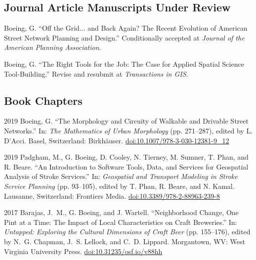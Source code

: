 \documentclass[12pt,letterpaper]{report}
\begin{document}
    \subsection*{Journal Article Manuscripts Under Review}

    \begin{tablist}
        
        \item[\the\year] \tab Boeing, G. \enquote{Off the Grid... and Back Again? The Recent Evolution of American Street Network Planning and Design.} Conditionally accepted at \textit{Journal of the American Planning Association}.        

        \item[\the\year] \tab Boeing, G. \enquote{The Right Tools for the Job: The Case for Applied Spatial Science Tool-Building.} Revise and resubmit at \textit{Transactions in GIS}.

    \end{tablist}



    \subsection*{Book Chapters}

    \begin{tablist}

        \item[2019] \tab Boeing, G. \enquote{The Morphology and Circuity of Walkable and Drivable Street Networks.} In: \textit{The Mathematics of Urban Morphology} (pp. 271--287), edited by L. D'Acci. Basel, Switzerland: Birkhäuser. \href{https://doi.org/10.1007/978-3-030-12381-9_12}{doi:10.1007/978-3-030-12381-9\_12}
        
        \item[2019] \tab Padgham, M., G. Boeing, D. Cooley, N. Tierney, M. Sumner, T. Phan, and R. Beare. \enquote{An Introduction to Software Tools, Data, and Services for Geospatial Analysis of Stroke Services.} In: \textit{Geospatial and Transport Modeling in Stroke Service Planning} (pp. 93--105), edited by T. Phan, R. Beare, and N. Kamal.  Lausanne, Switzerland: Frontiers Media. \href{https://doi.org/10.3389/978-2-88963-239-8}{doi:10.3389/978-2-88963-239-8}

        \item[2017] \tab Barajas, J.~M., G. Boeing, and J. Wartell. \enquote{Neighborhood Change, One Pint at a Time: The Impact of Local Characteristics on Craft Breweries.} In: \textit{Untapped: Exploring the Cultural Dimensions of Craft Beer} (pp. 155--176), edited by N.~G. Chapman, J.~S. Lellock, and C.~D. Lippard. Morgantown, WV: West Virginia University Press. \href{https://doi.org/10.31235/osf.io/v88hh}{doi:10.31235/osf.io/v88hh}

    \end{tablist}
\end{document}
